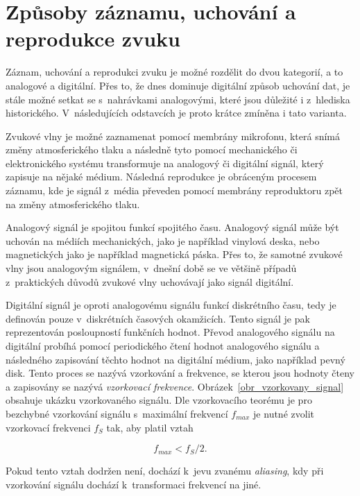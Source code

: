 \section{Způsoby záznamu, uchování a reprodukce zvuku}
\label{zpusoby_zaznamu_uchovani_a_reprodukce_zvuku}
Záznam, uchování a reprodukci zvuku je možné rozdělit do dvou kategorií, a to analogové a digitální. Přes to, že dnes dominuje digitální způsob uchování dat, je stále možné setkat se s~nahrávkami analogovými, které jsou důležité i z~hlediska historického. V~následujících odstavcích je proto krátce zmíněna i tato varianta.\cite{dsp}\cite{aca}

Zvukové vlny je možné zaznamenat pomocí membrány mikrofonu, která snímá změny atmosferického tlaku a následně tyto pomocí mechanického či elektronického systému transformuje na analogový či digitální signál, který zapisuje na nějaké médium. Následná reprodukce je obráceným procesem záznamu, kde je signál z~média převeden pomocí membrány reproduktoru zpět na změny atmosferického tlaku.\cite{dsp}\cite{aca}

Analogový signál je spojitou funkcí spojitého času. Analogový signál může být uchován na médiích mechanických, jako je například vinylová deska, nebo magnetických jako je například magnetická páska. Přes to, že samotné zvukové vlny jsou analogovým signálem, v~dnešní době se ve většině případů z~praktických důvodů zvukové vlny uchovávají jako signál digitální.\cite{dsp}\cite{aca}

Digitální signál je oproti analogovému signálu funkcí diskrétního času, tedy je definován pouze v~diskrétních časových okamžicích. Tento signál je pak reprezentován posloupností funkčních hodnot. Převod analogového signálu na digitální probíhá pomocí periodického čtení hodnot analogového signálu a následného zapisování těchto hodnot na digitální médium, jako například pevný disk. Tento proces se nazývá vzorkování a frekvence, se kterou jsou hodnoty čteny a zapisovány se nazývá \textit{vzorkovací frekvence}. Obrázek~\ref{obr_vzorkovany_signal} obsahuje ukázku vzorkovaného signálu. Dle vzorkovacího teorému je pro bezchybné vzorkování signálu s~maximální frekvencí $f_{max}$ je nutné zvolit vzorkovací frekvenci $f_S$ tak, aby platil vztah

\begin{equation}
	f_{max} < f_S/2.
\end{equation}

\medskip

\noindent Pokud tento vztah dodržen není, dochází k~jevu zvanému \textit{aliasing}, kdy při vzorkování signálu dochází k~transformaci frekvencí na jiné.\cite{dsp}\cite{aca}

